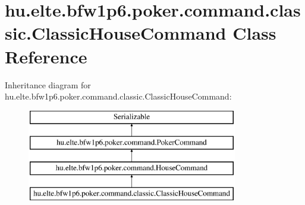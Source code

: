 \hypertarget{classhu_1_1elte_1_1bfw1p6_1_1poker_1_1command_1_1classic_1_1_classic_house_command}{}\section{hu.\+elte.\+bfw1p6.\+poker.\+command.\+classic.\+Classic\+House\+Command Class Reference}
\label{classhu_1_1elte_1_1bfw1p6_1_1poker_1_1command_1_1classic_1_1_classic_house_command}
Inheritance diagram for hu.\+elte.\+bfw1p6.\+poker.\+command.\+classic.\+Classic\+House\+Command\+:\begin{figure}[H]
\begin{center}
\leavevmode
\includegraphics[height=4.000000cm]{classhu_1_1elte_1_1bfw1p6_1_1poker_1_1command_1_1classic_1_1_classic_house_command}
\end{center}
\end{figure}
